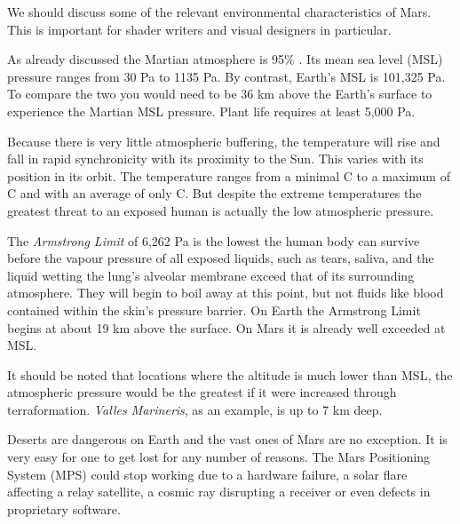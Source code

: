 

We should discuss some of the relevant environmental characteristics of Mars. This is important for shader writers and visual designers in particular.

As already discussed the Martian atmosphere is 95\% . Its mean sea level (MSL) pressure ranges from 30 Pa to 1135 Pa. By contrast, Earth's MSL is 101,325 Pa. To compare the two you would need to be 36 km above the Earth's surface to experience the Martian MSL pressure. Plant life requires at least 5,000 Pa.

Because there is very little atmospheric buffering, the temperature will rise and fall in rapid synchronicity with its proximity to the Sun. This varies with its position in its orbit. The temperature ranges from a minimal C to a maximum of C and with an average of only C. But despite the extreme temperatures the greatest threat to an exposed human is actually the low atmospheric pressure.

The {\it Armstrong Limit} of 6,262 Pa is the lowest the human body can survive before the vapour pressure of all exposed liquids, such as tears, saliva, and the liquid wetting the lung's alveolar membrane exceed that of its surrounding atmosphere. They will begin to boil away at this point, but not fluids like blood contained within the skin's pressure barrier. On Earth the Armstrong Limit begins at about 19 km above the surface. On Mars it is already well exceeded at MSL.

It should be noted that locations where the altitude is much lower than MSL, the atmospheric pressure would be the greatest if it were increased through terraformation. {\it Valles Marineris}, as an example, is up to 7 km deep.

Deserts are dangerous on Earth and the vast ones of Mars are no exception. It is very easy for one to get lost for any number of reasons. The Mars Positioning System (MPS) could stop working due to a hardware failure, a solar flare affecting a relay satellite, a cosmic ray disrupting a receiver or even defects in proprietary software.

